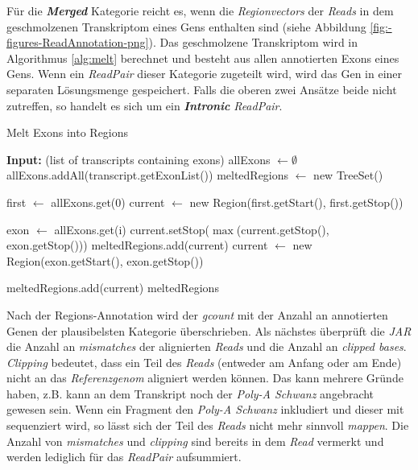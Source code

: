 \documentclass[12pt]{article}
\begin{document}
Für die \textit{\textbf{Merged}} Kategorie reicht es, wenn die \textit{Regionvectors} der \textit{Reads} in dem geschmolzenen
Transkriptom eines Gens enthalten sind (siehe Abbildung \ref{fig:-figures-ReadAnnotation-png}). 
Das geschmolzene Transkriptom wird in Algorithmus \ref{alg:melt} berechnet und besteht aus allen annotierten Exons 
eines Gens. Wenn ein \textit{ReadPair} dieser Kategorie zugeteilt wird, wird das Gen in einer separaten Lösungsmenge
gespeichert. Falls die oberen zwei Ansätze beide nicht zutreffen, so handelt es sich um ein \textit{\textbf{Intronic}}
\textit{ReadPair}.


\begin{algorithm}[H]
\caption{Melt Exons into Regions}\label{alg:melt}
\begin{algorithmic}[1]
\State \textbf{Input:}  (list of transcripts containing exons)
\State allExons $\gets \emptyset$
    \State allExons.addAll(transcript.getExonList()) 
\EndFor
\State {} 
\State meltedRegions $\gets$ new TreeSet() 

    \State first $\gets$ allExons.get(0) 
    \State current $\gets$ new Region(first.getStart(), first.getStop()) 

        \State exon $\gets$ allExons.get(i)
            \State current.setStop($\max$(current.getStop(), exon.getStop())) 
        \Else
            \State meltedRegions.add(current) 
            \State current $\gets$ new Region(exon.getStart(), exon.getStop()) 
        \EndIf
    \EndFor

    \State meltedRegions.add(current) 
\EndIf
\State \Return meltedRegions 
\end{algorithmic}
\end{algorithm}

Nach der Regions-Annotation wird der \textit{gcount} mit der Anzahl an annotierten Genen der 
plausibelsten Kategorie überschrieben. Als nächstes überprüft die \textit{JAR} die Anzahl an 
\textit{mismatches} der alignierten \textit{Reads} und die Anzahl an \textit{clipped bases}. 
\textit{Clipping} bedeutet, dass ein Teil des \textit{Reads} (entweder am Anfang oder am Ende) nicht 
an das \textit{Referenzgenom} aligniert werden können. Das kann mehrere Gründe haben,
z.B. kann an dem Transkript noch der \textit{Poly-A Schwanz} angebracht gewesen sein. Wenn ein
Fragment den \textit{Poly-A Schwanz} inkludiert und dieser mit sequenziert wird, so lässt sich der
Teil des \textit{Reads} nicht mehr sinnvoll \textit{mappen}.
Die Anzahl von \textit{mismatches} und \textit{clipping} sind bereits in dem \textit{Read} vermerkt
und werden lediglich für das \textit{ReadPair} aufsummiert.
\end{document}

